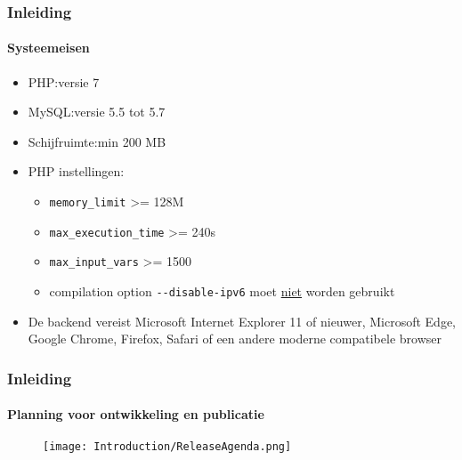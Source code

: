 \begin{frame}[fragile]
	\frametitle{Inleiding}
	\framesubtitle{Systeemeisen}

	\begin{itemize}
		\item PHP:\tabto{2.2cm}versie 7
		\item MySQL:\tabto{2.2cm}versie 5.5 tot 5.7
		\item Schijfruimte:\tabto{2.2cm}min 200 MB
		\item PHP instellingen:

			\begin{itemize}
				\item \texttt{memory\_limit} >= 128M
				\item \texttt{max\_execution\_time} >= 240s
				\item \texttt{max\_input\_vars} >= 1500
				\item compilation option \texttt{-}\texttt{-disable-ipv6} moet \underline{niet} worden gebruikt
			\end{itemize}

		\item De backend vereist Microsoft Internet Explorer 11 of nieuwer,
			Microsoft Edge, Google Chrome, Firefox, Safari of een andere moderne
			compatibele browser

	\end{itemize}

\end{frame}

\begin{frame}[fragile]
	\frametitle{Inleiding}
	\framesubtitle{Planning voor ontwikkeling en publicatie}

	\begin{figure}
		\texttt{[image: Introduction/ReleaseAgenda.png]}
	\end{figure}

\end{frame}

